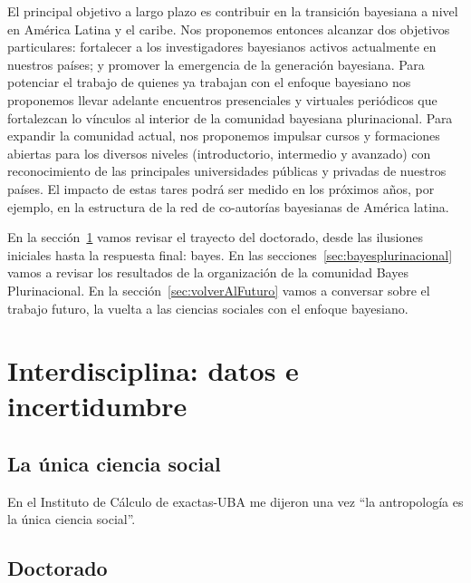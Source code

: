 \documentclass[a4paper,11pt]{book}
\theoremstyle{definition}
\begin{document}
El principal objetivo a largo plazo es contribuir en la transición bayesiana a nivel en América Latina y el caribe.
%
Nos proponemos entonces alcanzar dos objetivos particulares: fortalecer a los investigadores bayesianos activos actualmente en nuestros países; y promover la emergencia de la generación bayesiana.
%
Para potenciar el trabajo de quienes ya trabajan con el enfoque bayesiano nos proponemos llevar adelante encuentros presenciales y virtuales periódicos que fortalezcan lo vínculos al interior de la comunidad bayesiana plurinacional.
%
Para expandir la comunidad actual, nos proponemos impulsar cursos y formaciones abiertas para los diversos niveles (introductorio, intermedio y avanzado) con reconocimiento de las principales universidades públicas y privadas de nuestros países.
%
El impacto de estas tares podrá ser medido en los próximos años, por ejemplo, en la estructura de la red de co-autorías bayesianas de América latina.


En la sección~\ref{sec:doctorado} vamos revisar el trayecto del doctorado, desde las ilusiones iniciales hasta la respuesta final: bayes.
%
En las secciones~\ref{sec:bayesplurinacional} vamos a revisar los resultados de la organización de la comunidad Bayes Plurinacional.
%
En la sección~\ref{sec:volverAlFuturo} vamos a conversar sobre el trabajo futuro, la vuelta a las ciencias sociales con el enfoque bayesiano.


\section{Interdisciplina: datos e incertidumbre} \label{sec:doctorado}

\subsection{La única ciencia social}

En el Instituto de Cálculo de exactas-UBA me dijeron una vez ``la antropología es la única ciencia social''.
%



\subsection{Doctorado}
\end{document}
